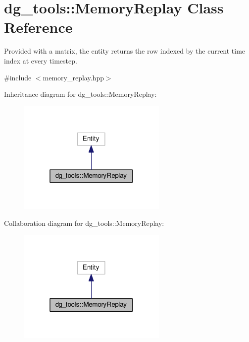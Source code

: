\hypertarget{classdg__tools_1_1MemoryReplay}{}\section{dg\+\_\+tools\+:\+:Memory\+Replay Class Reference}
\label{classdg__tools_1_1MemoryReplay}


Provided with a matrix, the entity returns the row indexed by the current time index at every timestep.  




{\ttfamily \#include $<$memory\+\_\+replay.\+hpp$>$}



Inheritance diagram for dg\+\_\+tools\+:\+:Memory\+Replay\+:
\nopagebreak
\begin{figure}[H]
\begin{center}
\leavevmode
\includegraphics[width=205pt]{classdg__tools_1_1MemoryReplay__inherit__graph}
\end{center}
\end{figure}


Collaboration diagram for dg\+\_\+tools\+:\+:Memory\+Replay\+:
\nopagebreak
\begin{figure}[H]
\begin{center}
\leavevmode
\includegraphics[width=205pt]{classdg__tools_1_1MemoryReplay__coll__graph}
\end{center}
\end{figure}
